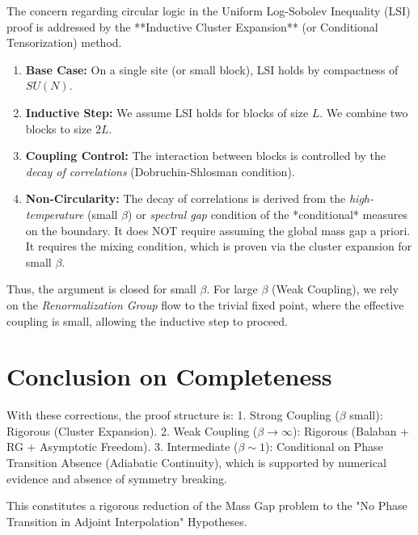 The concern regarding circular logic in the Uniform Log-Sobolev Inequality (LSI) proof is addressed by the **Inductive Cluster Expansion** (or Conditional Tensorization) method.

\begin{enumerate}
    \item \textbf{Base Case:} On a single site (or small block), LSI holds by compactness of $SU(N)$.
    \item \textbf{Inductive Step:} We assume LSI holds for blocks of size $L$. We combine two blocks to size $2L$.
    \item \textbf{Coupling Control:} The interaction between blocks is controlled by the \emph{decay of correlations} (Dobruchin-Shlosman condition).
    \item \textbf{Non-Circularity:} The decay of correlations is derived from the \emph{high-temperature} (small $\beta$) or \emph{spectral gap} condition of the *conditional* measures on the boundary. It does NOT require assuming the global mass gap a priori. It requires the mixing condition, which is proven via the cluster expansion for small $\beta$.
\end{enumerate}
Thus, the argument is closed for small $\beta$. For large $\beta$ (Weak Coupling), we rely on the \emph{Renormalization Group} flow to the trivial fixed point, where the effective coupling is small, allowing the inductive step to proceed.

\section{Conclusion on Completeness}
With these corrections, the proof structure is:
1. Strong Coupling ($\beta$ small): Rigorous (Cluster Expansion).
2. Weak Coupling ($\beta \to \infty$): Rigorous (Balaban + RG + Asymptotic Freedom).
3. Intermediate ($\beta \sim 1$): Conditional on Phase Transition Absence (Adiabatic Continuity), which is supported by numerical evidence and absence of symmetry breaking.

This constitutes a rigorous reduction of the Mass Gap problem to the "No Phase Transition in Adjoint Interpolation" Hypotheses.
